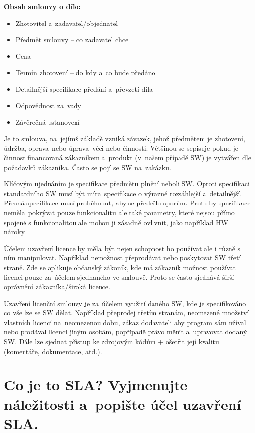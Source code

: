 \textbf{Obsah smlouvy o dílo:}
\begin{itemize}[noitemsep]
    \item Zhotovitel a~zadavatel/objednatel
    \item Předmět smlouvy -- co zadavatel chce
    \item Cena
    \item Termín zhotovení -- do kdy a~co bude předáno
    \item Detailnější specifikace předání a~převzetí díla
    \item Odpovědnost za~vady
    \item Závěrečná ustanovení
\end{itemize}

Je to smlouva, na~jejímž základě vzniká závazek, jehož předmětem je zhotovení, údržba, oprava~nebo úprava~věci nebo činnosti. Většinou se sepisuje pokud je činnost financovaná zákazníkem a~produkt (v~našem případě SW) je vytvářen dle požadavků zákazníka. Často se pojí se SW na~zakázku.

Klíčovým ujednáním je specifikace předmětu plnění neboli SW\@. Oproti specifikaci standardního SW musí být míra~specifikace o výrazně rozsáhlejší a~detailnější. Přesná specifikace musí proběhnout, aby se předešlo sporům. Proto by specifikace neměla~pokrývat pouze funkcionalitu ale také parametry, které nejsou přímo spojené s funkcionalitou ale mohou ji zásadně ovlivnit, jako například HW nároky.

Účelem uzavření licence by měla~být nejen schopnost ho používat ale i různě s ním manipulovat. Například nemožnost přeprodávat nebo poskytovat SW třetí straně. Zde se aplikuje občanský zákoník, kde má zákazník možnost používat licenci pouze za~účelem sjednaného ve smlouvě. Proto se často sjednává širší oprávnění zákazníka/široká licence.

Uzavření licenční smlouvy je za~účelem využití daného SW, kde je specifikováno co vše lze se SW dělat. Například přeprodej třetím stranám, neomezené množství vlastních licencí na~neomezenou dobu, zákaz dodavateli aby program sám užíval nebo prodával licenci jiným osobám, popřípadě právo měnit a~upravovat dodaný SW. Dále lze sjednat přístup ke zdrojovým kódům + ošetřit její kvalitu (komentáře, dokumentace, atd.).


\newpage
\section{Co je to SLA\@? Vyjmenujte náležitosti a~popište účel uzavření SLA.}

